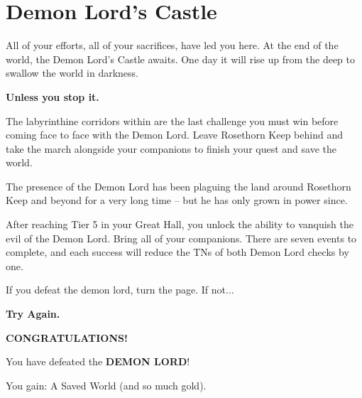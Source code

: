 \chapter{Demon Lord's Castle}

All of your efforts, all of your sacrifices, have led you here. At the end of the world, the Demon Lord’s Castle awaits. One day it will rise up from the deep to swallow the world in darkness.

\skipline

\textbf{Unless you stop it.}

\skipline

The labyrinthine corridors within are the last challenge you must win before coming face to face with the Demon Lord. Leave Rosethorn Keep behind and take the march alongside your companions to finish your quest and save the world.

\skipline

The presence of the Demon Lord has been plaguing the land around Rosethorn Keep and beyond for a very long time – but he has only grown in power since.

\skipline

After reaching Tier 5 in your Great Hall, you unlock the ability to vanquish the evil of the Demon Lord. Bring all of your companions. There are seven events to complete, and each success will reduce the TNs of both Demon Lord checks by one.

\pagebreak

\thispagestyle{empty}

\vspace*{\fill}
\begin{adjustbox}{center}
\end{adjustbox}
\vspace*{0pt}
%

\pagebreak



If you defeat the demon lord, turn the page. If not...
\skipline
\skipline

\begin{adjustbox}{center}
	\textbf{Try Again.}
\end{adjustbox}

\pagebreak

\thispagestyle{empty}
\vspace*{\fill}
\begin{adjustbox}{center}
\end{adjustbox}
\begin{adjustbox}{center}
	\textbf{CONGRATULATIONS!}
\end{adjustbox}
\begin{adjustbox}{center}
	You have defeated the \textbf{DEMON LORD}!
\end{adjustbox}
\begin{adjustbox}{center}
	You gain: A Saved World (and so much gold).
\end{adjustbox}
\vspace*{\fill}
%




